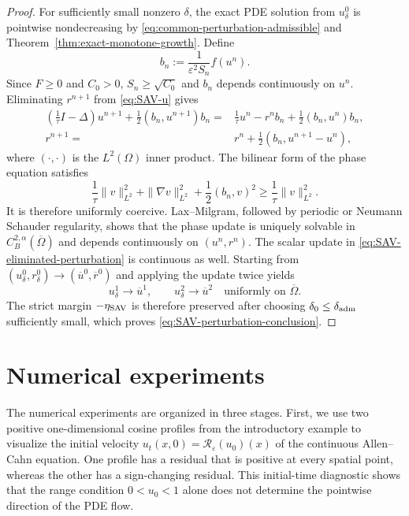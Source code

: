 \documentclass[final, 3p, times]{elsarticle}%
\newcommand{\eps}{\varepsilon}
\newcommand{\Reps}{\mathcal R_\varepsilon}
\begin{document}
\begin{proof}
For sufficiently small nonzero $\delta$, the exact PDE solution from
$u^0_\delta$ is pointwise nondecreasing by
\eqref{eq:common-perturbation-admissible} and
Theorem~\ref{thm:exact-monotone-growth}.
Define
\[
    b_n:=\frac{1}{\eps^2S_n}f(u^n).
\]
Since $F\ge0$ and $C_0>0$, $S_n\ge\sqrt{C_0}$ and $b_n$ depends
continuously on $u^n$. Eliminating $r^{n+1}$ from \eqref{eq:SAV-u} gives
\begin{equation}
\begin{aligned}
    \left(\frac1\tau I-\Delta\right)u^{n+1}
    +\frac12(b_n,u^{n+1})b_n
    ={}&\frac1\tau u^n-r^n b_n
       +\frac12(b_n,u^n)b_n,\\
    r^{n+1}={}&r^n+\frac12(b_n,u^{n+1}-u^n),
\end{aligned}
\label{eq:SAV-eliminated-perturbation}
\end{equation}
where $(\cdot,\cdot)$ is the $L^2(\Omega)$ inner product. The bilinear
form of the phase equation satisfies
\[
    \frac1\tau\|v\|_{L^2}^2
    +\|\nabla v\|_{L^2}^2
    +\frac12(b_n,v)^2
    \ge\frac1\tau\|v\|_{L^2}^2.
\]
It is therefore uniformly coercive. Lax--Milgram, followed by periodic or
Neumann Schauder regularity, shows that the phase update is uniquely
solvable in $C_B^{2,\alpha}(\overline\Omega)$ and depends continuously on
$(u^n,r^n)$. The scalar update in
\eqref{eq:SAV-eliminated-perturbation} is continuous as well. Starting from
$(u^0_\delta,r^0_\delta)\to(\overline u^0,\overline r^0)$ and applying the
update twice yields
\[
    u^1_\delta\longrightarrow\overline u^1,
    \qquad
    u^2_\delta\longrightarrow\overline u^2
    \quad\text{uniformly on }\overline\Omega.
\]
The strict margin $-\eta_{\rm SAV}$ is therefore preserved after choosing
$\delta_0\le\delta_{\rm adm}$ sufficiently small, which proves
\eqref{eq:SAV-perturbation-conclusion}.
\end{proof}



\section{Numerical experiments}
\label{sec:num}

The numerical experiments are organized in three stages. First, we use
two positive one-dimensional cosine profiles from the introductory example
to visualize the initial velocity
$
    u_t(x,0)=\Reps(u_0)(x)
$
of the continuous Allen--Cahn equation. One profile has a residual that is
positive at every spatial point, whereas the other has a sign-changing
residual. This initial-time diagnostic shows that the range condition
$0<u_0<1$ alone does not determine the pointwise direction of the PDE flow.
\end{document}
